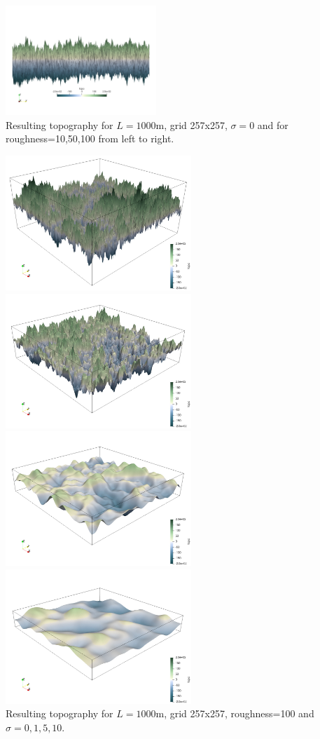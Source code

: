 \begin{center}
\includegraphics[width=5.7cm]{python_codes/fieldstone_56/results/topo100}\\
{\captionfont Resulting topography for $L=1000$m, grid 257x257, $\sigma=0$ and for 
roughness=10,50,100 from left to right.}
\end{center}

\begin{center}
\includegraphics[width=7cm]{python_codes/fieldstone_56/results/topo_sig000}
\includegraphics[width=7cm]{python_codes/fieldstone_56/results/topo_sig001}\\
\includegraphics[width=7cm]{python_codes/fieldstone_56/results/topo_sig005}
\includegraphics[width=7cm]{python_codes/fieldstone_56/results/topo_sig010}\\
{\captionfont Resulting topography for $L=1000$m, grid 257x257, 
roughness=100 and $\sigma=0,1,5,10$.}
\end{center}

